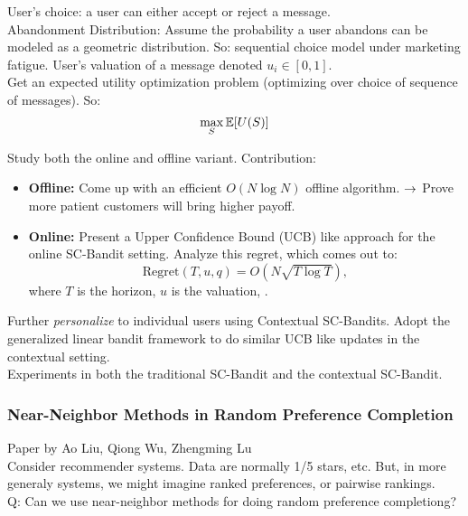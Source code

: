 User's choice: a user can either accept or reject a message. \\

Abandonment Distribution: Assume the probability a user abandons can be modeled as a geometric distribution. So: sequential choice model under marketing fatigue. User's valuation of a message denoted $u_i \in [0,1]$. \\

Get an expected utility optimization problem (optimizing over choice of sequence of messages). So:
\begin{equation}
    \max_S \mathbb{E}[U(S)]
\end{equation}

Study both the online and offline variant.  Contribution:
\begin{itemize}
    \item {\bf Offline:} Come up with an efficient $O(N\log N)$ offline algorithm.
    $\rightarrow$ Prove more patient customers will bring higher payoff.
    \item {\bf Online:} Present a Upper Confidence Bound (UCB) like approach for the online SC-Bandit setting. Analyze this regret, which comes out to:
    \[
    \text{Regret}(T,u,q) = O(N \sqrt{T \log T}),
    \]
    where $T$ is the horizon, $u$ is the valuation, .
\end{itemize}

Further {\it personalize} to individual users using Contextual SC-Bandits. Adopt the generalized linear bandit framework to do similar UCB like updates in the contextual setting. \\

Experiments in both the traditional SC-Bandit and the contextual SC-Bandit. 

\subsubsection{Near-Neighbor Methods in Random Preference Completion~\cite{liu2019nearneighbor}}

Paper by Ao Liu, Qiong Wu, Zhengming Lu \\

Consider recommender systems. Data are normally 1/5 stars, etc. But, in more generaly systems, we might imagine ranked preferences, or pairwise rankings. \\

Q: Can we use near-neighbor methods for doing random preference completiong? \\

